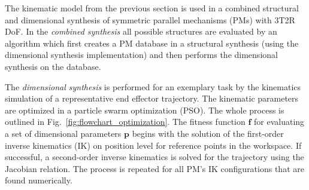 \documentclass[
	graybox,
	vecphys] %
	{svmult}
\newcommand{\bm}[1]{\boldsymbol{#1}}
\newcommand{\Res}[0]{\vec{\delta}}
\newcommand{\ResR}[0]{\vec{\psi}}
\begin{document}
The kinematic model from the previous section is used in a combined structural and dimensional synthesis of symmetric parallel mechanisms (PMs) with 3T2R DoF.
In the \emph{combined synthesis} all possible structures are evaluated by an algorithm which first creates a PM database in a structural synthesis (using the dimensional synthesis implementation) and then performs the dimensional synthesis on the database.

The \emph{dimensional synthesis} is performed for an exemplary task by the kinematics simulation of a representative end effector trajectory. %
The kinematic parameters are optimized in a particle swarm optimization (PSO).
The whole process is outlined in Fig.~\ref{fig:flowchart_optimization}.
The fitness function $\bm{f}$ for evaluating a set of dimensional parameters $\bm{p}$ begins with the solution of the first-order inverse kinematics (IK) on position level 
for reference points in the workspace. 
If successful, a second-order inverse kinematics is solved for the trajectory using the Jacobian relation.
The process is repeated for all PM's IK configurations that are found numerically.
\end{document}
